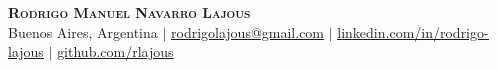 
\begin{center}
    \textbf{\Huge \scshape Rodrigo Manuel Navarro Lajous} \\ \vspace{10pt}
    \small Buenos Aires, Argentina $|$ \href{mailto:rodrigolajous@gmail.com}{\underline{rodrigolajous@gmail.com}} $|$ 
    \href{https://www.linkedin.com/in/rodrigo-lajous/}{\underline{linkedin.com/in/rodrigo-lajous}} $|$
    \href{https://github.com/rlajous}{\underline{github.com/rlajous}}
\end{center}
